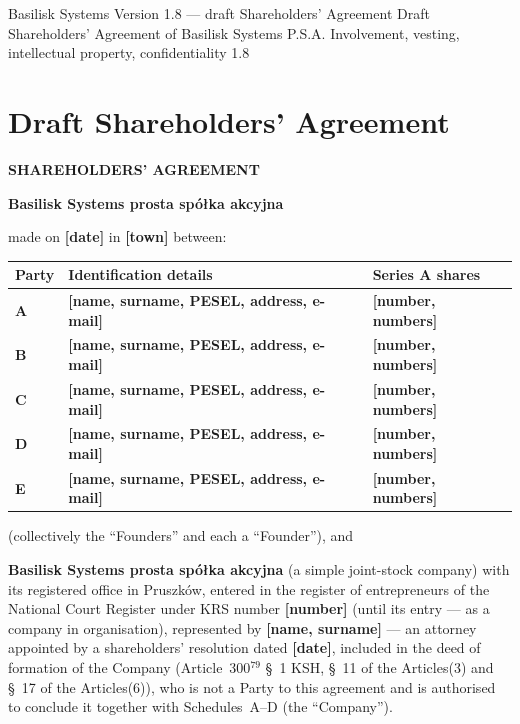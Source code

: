 \documentclass[12pt,a4paper]{report}
\newcommand{\field}[1]{\textbf{[#1]}}
\newcommand{\CompanyFull}{Basilisk Systems prosta spółka akcyjna}
\newcommand{\USen}[1]{\S~#1 of the Articles}
\begin{document}

\BusinessPlanTitlePage
  {Basilisk Systems}
  {Version 1.8 --- draft}
  {Shareholders' Agreement}
  {Draft Shareholders' Agreement of Basilisk Systems P.S.A.}
  {Involvement, vesting, intellectual property, confidentiality}
  {1.8}

\tableofcontents
\newpage

\chapter*{Draft Shareholders' Agreement}

\begin{center}
{\Large\bfseries SHAREHOLDERS' AGREEMENT}\par
\vspace{0.25cm}
{\LARGE\bfseries \CompanyFull}\par
\vspace{0.6cm}
\end{center}

made on \field{date} in \field{town} between:

\begin{center}
\begin{tabularx}{\textwidth}{>{\bfseries}p{1.6cm} >{\raggedright\arraybackslash}X >{\raggedright\arraybackslash}p{3.2cm}}
\toprule
Party & Identification details & Series A shares \\
\midrule
A & \field{name, surname, PESEL, address, e-mail} & \field{number, numbers} \\
B & \field{name, surname, PESEL, address, e-mail} & \field{number, numbers} \\
C & \field{name, surname, PESEL, address, e-mail} & \field{number, numbers} \\
D & \field{name, surname, PESEL, address, e-mail} & \field{number, numbers} \\
E & \field{name, surname, PESEL, address, e-mail} & \field{number, numbers} \\
\bottomrule
\end{tabularx}
\end{center}

(collectively the ``Founders'' and each a ``Founder''), and

\textbf{\CompanyFull} (a simple joint-stock company) with its registered office in Pruszków, entered in the register of entrepreneurs of the National Court Register under KRS number \field{number} (until its entry --- as a company in organisation), represented by \field{name, surname} --- an attorney appointed by a shareholders' resolution dated \field{date}, included in the deed of formation of the Company (Article~300$^{79}$ \S~1 KSH, \USen{11}(3) and \USen{17}(6)), who is not a Party to this agreement and is authorised to conclude it together with Schedules~A--D (the ``Company'').
\end{document}
